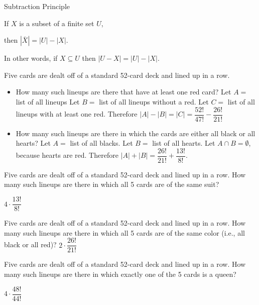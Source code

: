\documentclass[openany, 12pt]{book}
\begin{document}
\begin{definition}{Subtraction Principle}{}
	\begin{blist}
		\item If $X$ is a subset of a finite set $U$,
		\item then $|\bar{X}|=|U|-|X|$.
		\item In other words, if $X \subseteq U$ then $|U-X|=|U|-|X|$.
	\end{blist}
\end{definition}

\begin{exercise}{}{}
	Five cards are dealt off of a standard 52-card deck and
	lined up in a row.
	\begin{itemize}
		\item How many such lineups are there that have at least one red card?
		      Let $A=$ list of all lineups
		      Let $B=$ list of all lineups without a red.
		      Let $C=$ list of all lineups with at least one red.
		      Therefore $|A| - |B| = |C| = \dfrac{52!}{47!} - \dfrac{26!}{21!}$
		\item How many such lineups are there in which the cards are either all
		      black or all hearts?
		      Let $A=$ list of all blacks.
		      Let $B=$ list of all hearts.
		      Let $A \cap B= \emptyset$, because hearts are red.
		      Therefore $|A|+ |B| =\dfrac{26!}{21!} + \dfrac{13!}{8!}$.
	\end{itemize}
\end{exercise}

\begin{exercise}{}{}
	Five cards are dealt off of a standard 52-card deck and lined up in a row.
	How many such lineups are there in which all 5 cards are of the same suit?

	$4 \cdot \dfrac{13!}{8!}$
\end{exercise}

\begin{exercise}{}{}
	Five cards are dealt off of a standard 52-card deck and lined up in a row. How many such lineups are there in which all 5 cards are of the same color (i.e., all black or all red)?
	$2 \cdot \dfrac{26!}{21!}$
\end{exercise}

\begin{exercise}{}{}
	Five cards are dealt off of a standard 52-card deck and lined up in a row.
	How many such lineups are there in which exactly one of the 5 cards is a
	queen?

	$4 \cdot \dfrac{48!}{44!}$
\end{exercise}
\end{document}
